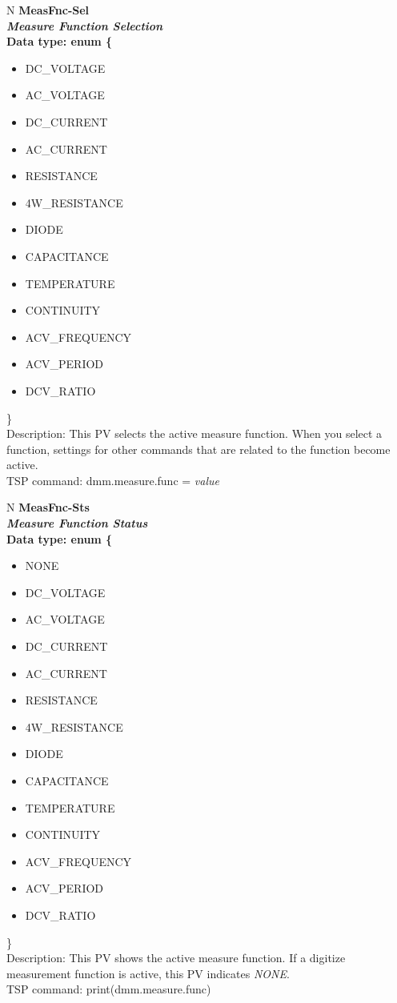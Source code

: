 \documentclass[openany]{article}
\begin{document}
		\begin{tabular}{N}
			\hline
			\bfseries MeasFnc-Sel \\ \hline
			\emph{Measure Function Selection} \\
			Data type: enum \{\begin{itemize}[noitemsep]
				\small
				\item[] DC\_VOLTAGE
				\item[] AC\_VOLTAGE
				\item[] DC\_CURRENT
				\item[] AC\_CURRENT
				\item[] RESISTANCE
				\item[] 4W\_RESISTANCE
				\item[] DIODE
				\item[] CAPACITANCE
				\item[] TEMPERATURE
				\item[] CONTINUITY
				\item[] ACV\_FREQUENCY
				\item[] ACV\_PERIOD
				\item[] DCV\_RATIO
			\end{itemize}\} \\
			Description: This PV selects the active measure function. When you select a function, settings for other commands that are related to the function become active. \\
			TSP command: dmm.measure.func = \emph{value}
		\end{tabular}

		\begin{tabular}{N}
			\hline
			\bfseries MeasFnc-Sts\label{pv:measfnc-sts} \\ \hline
			\emph{Measure Function Status} \\
			Data type: enum \{\begin{itemize}[noitemsep]
				\small
				\item[] NONE
				\item[] DC\_VOLTAGE
				\item[] AC\_VOLTAGE
				\item[] DC\_CURRENT
				\item[] AC\_CURRENT
				\item[] RESISTANCE
				\item[] 4W\_RESISTANCE
				\item[] DIODE
				\item[] CAPACITANCE
				\item[] TEMPERATURE
				\item[] CONTINUITY
				\item[] ACV\_FREQUENCY
				\item[] ACV\_PERIOD
				\item[] DCV\_RATIO
			\end{itemize}\} \\
			Description: This PV shows the active measure function. If a digitize measurement function is active, this PV indicates \emph{NONE}. \\
			TSP command: print(dmm.measure.func)
		\end{tabular}
\end{document}
